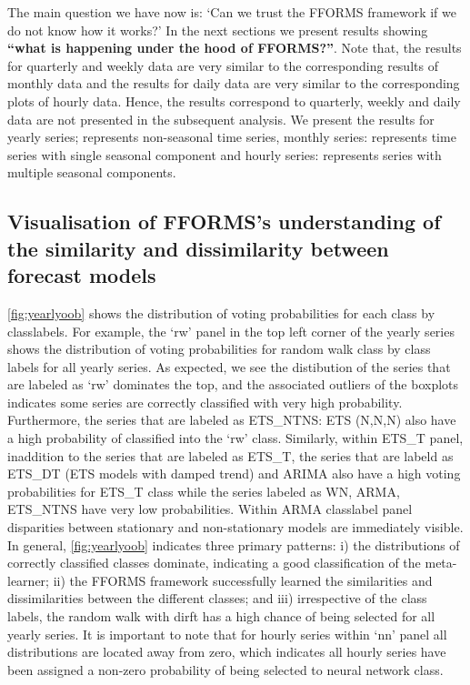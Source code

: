 \documentclass[11pt,a4paper,]{article}
\begin{document}
The main question we have now is: `Can we trust the FFORMS framework if we do not know how it works?' In the next sections we present results showing \textbf{``what is happening under the hood of FFORMS?''}. Note that, the results for quarterly and weekly data are very similar to the corresponding results of monthly data and the results for daily data are very similar to the corresponding plots of hourly data. Hence, the results correspond to quarterly, weekly and daily data are not presented in the subsequent analysis. We present the results for yearly series; represents non-seasonal time series, monthly series: represents time series with single seasonal component and hourly series: represents series with multiple seasonal components.

\hypertarget{oobviz}{%
\subsection{Visualisation of FFORMS's understanding of the similarity and dissimilarity between forecast models}\label{oobviz}}

\autoref{fig:yearlyoob} shows the distribution of voting probabilities for each class by classlabels. For example, the `rw' panel in the top left corner of the yearly series shows the distribution of voting probabilities for random walk class by class labels for all yearly series. As expected, we see the distibution of the series that are labeled as `rw' dominates the top, and the associated outliers of the boxplots indicates some series are correctly classified with very high probability. Furthermore, the series that are labeled as ETS\_NTNS: ETS (N,N,N) also have a high probability of classified into the `rw' class. Similarly, within ETS\_T panel, inaddition to the series that are labeled as ETS\_T, the series that are labeld as ETS\_DT (ETS models with damped trend) and ARIMA also have a high voting probabilities for ETS\_T class while the series labeled as WN, ARMA, ETS\_NTNS have very low probabilities. Within ARMA classlabel panel disparities between stationary and non-stationary models are immediately visible. In general, \autoref{fig:yearlyoob} indicates three primary patterns: i) the distributions of correctly classified classes dominate, indicating a good classification of the meta-learner; ii) the FFORMS framework successfully learned the similarities and dissimilarities between the different classes; and iii) irrespective of the class labels, the random walk with dirft has a high chance of being selected for all yearly series. It is important to note that for hourly series within `nn' panel all distributions are located away from zero, which indicates all hourly series have been assigned a non-zero probability of being selected to neural network class.
\end{document}
